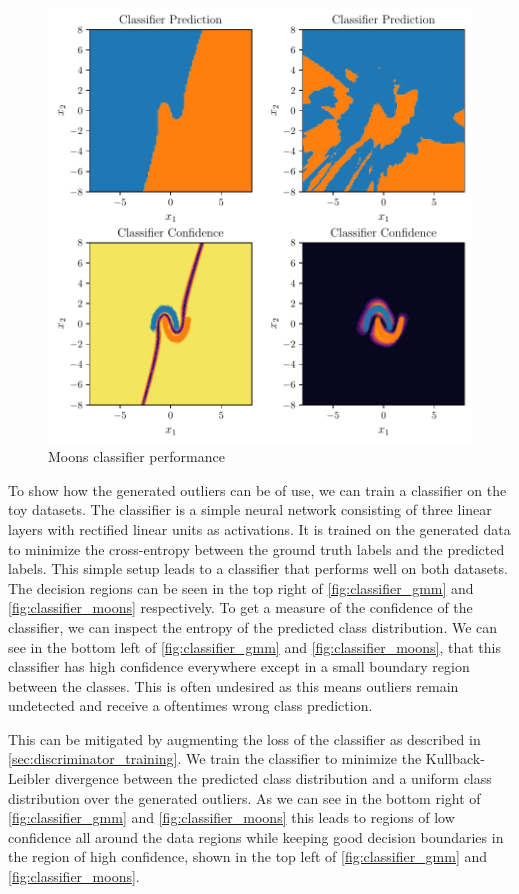 \begin{figure}[htpb]
	\centering
        \includegraphics{figures/toy_example/moons/classifier.pdf}
	\caption{Moons classifier performance}%
	\label{fig:classifier_moons}
\end{figure}

To show how the generated outliers can be of use, we can train a classifier on
the toy datasets. The classifier is a simple neural network consisting of three
linear layers with rectified linear units as activations. It is trained on the
generated data to minimize the cross-entropy between the ground truth labels
and the predicted labels. This simple setup leads to a classifier that
performs well on both datasets. The decision regions can be seen in the top
right of
\autoref{fig:classifier_gmm} and \autoref{fig:classifier_moons} respectively. To get a
measure of the confidence of the classifier, we can inspect the entropy of the
predicted class distribution. We can see in the bottom left of
\autoref{fig:classifier_gmm} and
\autoref{fig:classifier_moons}, that this classifier has high confidence
everywhere except in a small boundary region between the classes. This is often
undesired as this means outliers remain undetected and receive a oftentimes
wrong class prediction.

This can be mitigated by augmenting the loss of the classifier as described in
\autoref{sec:discriminator_training}. We train the classifier to minimize the
Kullback-Leibler divergence between the predicted class distribution and a
uniform class distribution over the generated outliers. As we can see in the
bottom right of \autoref{fig:classifier_gmm} and \autoref{fig:classifier_moons}
this leads to regions of low confidence all around the data regions while
keeping good decision boundaries in the region of high confidence, shown in the
top left of \autoref{fig:classifier_gmm} and \autoref{fig:classifier_moons}.

